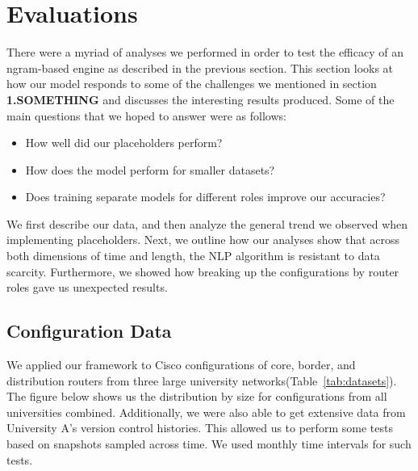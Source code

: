 \section{Evaluations}

There were a myriad of analyses we performed in order to test the efficacy of an ngram-based engine as described in the previous section. This section looks at how our model responds to some of the challenges we mentioned in section \textbf{1.SOMETHING} and discusses the interesting results produced. Some of the main questions that we hoped to answer were as follows: 
\begin{itemize}
  \item How well did our placeholders perform?
  \item How does the model perform for smaller datasets?
  \item Does training separate models for different roles improve our accuracies?
\end{itemize}

 We first describe our data, and then analyze the general trend we observed when implementing placeholders. Next, we outline how our analyses show that across both dimensions of time and length, the NLP algorithm is resistant to data scarcity. Furthermore, we showed how breaking up the configurations by router roles gave us unexpected results.

\subsection{Configuration Data}

We applied our framework to Cisco configurations of core, border, and distribution routers from three large university networks(Table~\ref{tab:datasets}). The figure below shows us the distribution by size for configurations from all universities combined. Additionally, we were also able to get extensive data from University A's version control histories. This allowed us to perform some tests based on snapshots sampled across time. We used monthly time intervals for such tests.

